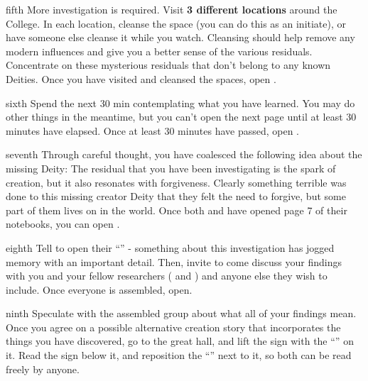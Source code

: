 \documentclass[notebook]{GL2020} %
\begin{document}
\begin{page}{fifth}
More investigation is required. Visit \textbf{3 different locations} around the College. In each location, cleanse the space (you can do this as an initiate), or have someone else cleanse it while you watch. Cleansing should help remove any modern influences and give you a better sense of the various residuals. Concentrate on these mysterious residuals that don’t belong to any known Deities. Once you have visited and cleansed the spaces, open .
\end{page}

\begin{page}{sixth}
Spend the next 30 min contemplating what you have learned. You may do other things in the meantime, but you can’t open the next page until at least 30 minutes have elapsed. Once at least 30 minutes have passed, open .
\end{page}

\begin{page}{seventh}
Through careful thought, you have coalesced the following idea about the missing Deity: The residual that you have been investigating is the spark of creation, but it also resonates with forgiveness. Clearly something terrible was done to this missing creator Deity that they felt the need to forgive, but some part of them lives on in the world. Once both \cHeadScientist{} and \cEbbPriest{} have opened page 7 of their notebooks, you can open .
\end{page}

\begin{page}{eighth}
Tell \cDisney{} to open their ``\mWThree{\MYname}'' - something about this investigation has jogged \cDisney{\their} memory with an important detail. Then, invite \cDisney{} to come discuss your findings with you and your fellow researchers ( \cHeadScientist{} and \cEbbPriest{}) and anyone else they wish to include. Once everyone is assembled, open.
\end{page}

\begin{page}{ninth}
Speculate with the assembled group about what all of your findings mean. Once you agree on a possible alternative creation story that incorporates the things you have discovered, go to the great hall, and lift the sign with the ``\sCreationMythOfficial{}'' on it. Read the sign below it, and reposition the ``\sCreationMythOfficial{}'' next to it, so both can be read freely by anyone.
\end{page}

\endnotebook
\end{document}
